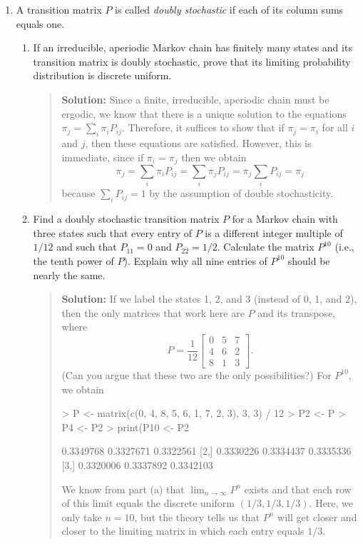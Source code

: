 \documentclass{article}
\begin{document}
\begin{enumerate}
\begin{enumerate}
  \end{enumerate}

  \item A transition matrix $P$ is called {\em doubly stochastic} if each
  of its column sums equals one.  
  
  \begin{enumerate}
  
    \item If an irreducible, aperiodic Markov chain has finitely many states and
    its transition matrix is doubly stochastic, prove that its limiting probability
    distribution is discrete uniform.
    \begin{quotation}{\bf Solution:}
    Since a finite, irreducible, aperiodic chain must be ergodic, we know that there
    is a unique solution to the equations $\pi_j=\sum_i\pi_iP_{ij}$.  Therefore, it suffices to
    show that if $\pi_j=\pi_i$ for all $i$ and $j$, then these equations are satisfied.  However,
    this is immediate, since if $\pi_i=\pi_j$ then we obtain
    \[
    \pi_j = \sum_i \pi_i P_{ij} = \sum_i\pi_j P_{ij} = \pi_j \sum_i P_{ij} = \pi_j
    \]
    because $\sum_iP_{ij}=1$ by the assumption of double stochasticity.
    \end{quotation}
    
    \item Find a doubly stochastic transition matrix $P$ for a Markov chain with
    three states such that every entry of $P$ is a different integer multiple of
    $1/12$ and such that $P_{11}=0$ and $P_{22}=1/2$. Calculate the matrix
    $P^{10}$ (i.e., the tenth power of $P$). Explain why all nine entries of
    $P^{10}$ should be nearly the same.
    \begin{quotation}{\bf Solution:}
    If we label the states 1, 2, and 3 (instead of 0, 1, and 2), then the only
    matrices that work here are $P$ and its transpose, where
    \[
    P = \frac{1}{12}
    \begin{bmatrix}
    0 & 5 & 7\\
    4 & 6 & 2 \\
    8 & 1 & 3 
    \end{bmatrix}.
    \]
    (Can you argue that these two are the only possibilities?)
    For $P^{10}$, we obtain
\begin{Schunk}
\begin{Sinput}
> P <- matrix(c(0, 4, 8, 5, 6, 1, 7, 2, 3), 3, 3) / 12
> P2 <- P %*% P
> P4 <- P2 %*% P2
> print(P10 <- P2 %*% P4 %*% P4)
\end{Sinput}
\begin{Soutput}
          [,1]      [,2]      [,3]
[1,] 0.3349768 0.3327671 0.3322561
[2,] 0.3330226 0.3334437 0.3335336
[3,] 0.3320006 0.3337892 0.3342103
\end{Soutput}
\end{Schunk}
    We know from part (a) that $\lim_{n\to\infty} P^n$ exists and that each row of
    this limit equals the discrete uniform $(1/3, 1/3, 1/3)$.  Here, we only take $n=10$, but
    the theory tells us that $P^n$ will get closer and closer to the limiting matrix 
    in which each entry equals $1/3$.
    \end{quotation}


\end{enumerate}
\end{enumerate}
\end{document}
